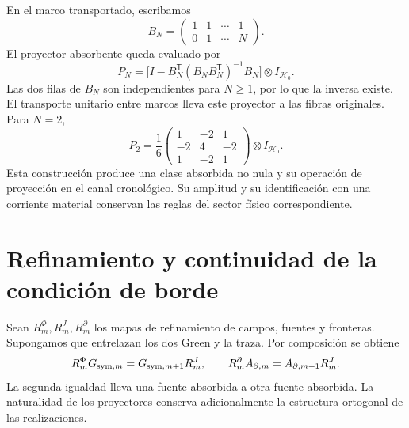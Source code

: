 En el marco transportado, escribamos
\[
 B_N=\begin{pmatrix}1&1&\cdots&1\\0&1&\cdots&N\end{pmatrix}.
\]
El proyector absorbente queda evaluado por
\begin{equation}
 P_N=\bigl[I-B_N^{\mathsf T}(B_NB_N^{\mathsf T})^{-1}B_N\bigr]
       \otimes I_{\mathcal H_0}.
 \label{x_reciprocidad:vii:eq:proyector-momentos-cronologicos}
\end{equation}
Las dos filas de \(B_N\) son independientes para \(N\geq1\), por lo
que la inversa existe. El transporte unitario entre marcos lleva este
proyector a las fibras originales. Para \(N=2\),
\[
 P_2=\frac16
 \begin{pmatrix}1&-2&1\\-2&4&-2\\1&-2&1\end{pmatrix}
 \otimes I_{\mathcal H_0}.
\]
Esta construcción produce una clase absorbida no nula y su operación de
proyección en el canal cronológico. Su amplitud y su identificación con una
corriente material conservan las reglas del sector físico correspondiente.

\section{Refinamiento y continuidad de la condición de borde}
\label{x_reciprocidad:vii:subsec:refinamiento-absorcion}

Sean \(R_m^\Phi,R_m^J,R_m^\partial\) los mapas de refinamiento de
campos, fuentes y fronteras. Supongamos que entrelazan los dos Green y la
traza. Por composición se obtiene
\begin{equation}
 R_m^\Phi G_{{\rm sym},m}=G_{{\rm sym},m+1}R_m^J,\qquad
 R_m^\partial\mathcal A_{\partial,m}
 =\mathcal A_{\partial,m+1}R_m^J.
 \label{x_reciprocidad:vii:eq:refinamiento-lectura-absorcion}
\end{equation}
La segunda igualdad lleva una fuente absorbida a otra fuente absorbida.
La naturalidad de los proyectores conserva adicionalmente la estructura
ortogonal de las realizaciones.

